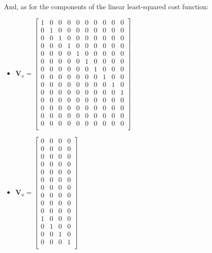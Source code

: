 \documentclass{thesisreport}
\begin{document}
\newpage

And, as for the components of the linear least-squared cost function:
\begin{multicols}{2}
\begin{itemize}
	\item $\bm{V}_x = \begin{bmatrix}
	1 & 0 & 0 & 0 & 0 & 0 & 0 & 0 & 0 & 0 \\
	0 & 1 & 0 & 0 & 0 & 0 & 0 & 0 & 0 & 0 \\
	0 & 0 & 1 & 0 & 0 & 0 & 0 & 0 & 0 & 0 \\
	0 & 0 & 0 & 1 & 0 & 0 & 0 & 0 & 0 & 0 \\
	0 & 0 & 0 & 0 & 1 & 0 & 0 & 0 & 0 & 0 \\
	0 & 0 & 0 & 0 & 0 & 1 & 0 & 0 & 0 & 0 \\
	0 & 0 & 0 & 0 & 0 & 0 & 1 & 0 & 0 & 0 \\
	0 & 0 & 0 & 0 & 0 & 0 & 0 & 1 & 0 & 0 \\
	0 & 0 & 0 & 0 & 0 & 0 & 0 & 0 & 1 & 0 \\
	0 & 0 & 0 & 0 & 0 & 0 & 0 & 0 & 0 & 1 \\
	0 & 0 & 0 & 0 & 0 & 0 & 0 & 0 & 0 & 0 \\
	0 & 0 & 0 & 0 & 0 & 0 & 0 & 0 & 0 & 0 \\
	0 & 0 & 0 & 0 & 0 & 0 & 0 & 0 & 0 & 0 \\
	0 & 0 & 0 & 0 & 0 & 0 & 0 & 0 & 0 & 0 \\
	\end{bmatrix}$
	
	
	
	
\end{itemize}
\columnbreak
\begin{itemize}

	\item $\bm{V}_u = \begin{bmatrix}
	0 & 0 & 0 & 0 \\
	0 & 0 & 0 & 0 \\
	0 & 0 & 0 & 0 \\
	0 & 0 & 0 & 0 \\
	0 & 0 & 0 & 0 \\
	0 & 0 & 0 & 0 \\
	0 & 0 & 0 & 0 \\
	0 & 0 & 0 & 0 \\
	0 & 0 & 0 & 0 \\
	0 & 0 & 0 & 0 \\
	1 & 0 & 0 & 0 \\
	0 & 1 & 0 & 0 \\
	0 & 0 & 1 & 0 \\
	0 & 0 & 0 & 1 \\
	\end{bmatrix}$
	
	
\end{itemize}
\end{multicols}
\end{document}
